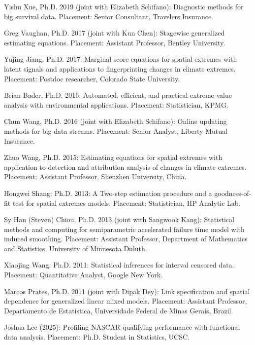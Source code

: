 \documentclass[Statistics]{vita}
\begin{document}
\begin{vita}
\begin{Students}
\begin{Ph.D.}
    \item Yishu Xue, Ph.D. 2019 (joint with Elizabeth Schifano): Diagnostic methods for big survival data. Placement: Senior Consultant, Travelers Insurance.
    \item Greg Vaughan, Ph.D. 2017 (joint with Kun Chen): Stagewise generalized estimating equations. Placement: Assistant Professor, Bentley University.
    \item Yujing Jiang, Ph.D. 2017: Marginal score equations for spatial extremes with latent signals and applications to fingerprinting changes in climate extremes. Placement: Postdoc researcher, Colorado State University.
    \item Brian Bader, Ph.D. 2016: Automated, efficient, and practical extreme value analysis with environmental applications. Placement: Statistician, KPMG.
    \item Chun Wang, Ph.D. 2016 (joint with Elizabeth Schifano): Online updating methods for big data streams. Placement: Senior Analyst, Liberty Mutual Insurance.
    \item Zhuo Wang, Ph.D. 2015: Estimating equations for spatial extremes with application to detection and attribution analysis of changes in climate extremes. Placement: Assistant Professor, Shenzhen University, China.
    \item Hongwei Shang: Ph.D. 2013: A Two-step estimation procedure and a goodness-of-fit test for spatial extremes models. Placement: Statistician, HP Analytic Lab.
    \item Sy Han (Steven) Chiou, Ph.D. 2013 (joint with Sangwook Kang): Statistical methods and computing for semiparametric accelerated failure time model with induced smoothing. Placement: Assistant Professor, Department of Mathematics and Statistics, University of Minnesota Duluth.
    \item Xiaojing Wang: Ph.D. 2011: Statistical inferences for interval censored data. Placement: Quantitative Analyst, Google New York.
    \item Marcos Prates, Ph.D. 2011 (joint with Dipak Dey): Link specification and spatial dependence for generalized linear mixed models. Placement: Assistant Professor, Departamento de Estat\'{i}stica, Universidade Federal de Minas Gerais, Brazil.
    \end{Ph.D.}
    \begin{UndergraduateHonor}
    \item Joshua Lee (2025): Profiling NASCAR qualifying performance with functional data analysis. Placement: Ph.D. Student in Statistics, UCSC.

\end{UndergraduateHonor}
\end{Students}
\end{vita}
\end{document}
